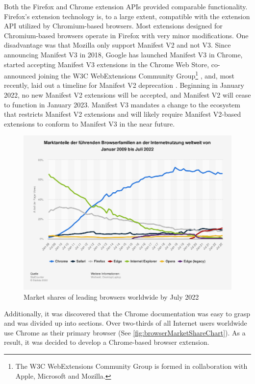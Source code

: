 Both the Firefox and Chrome extension APIs provided comparable functionality. Firefox's extension technology is, to a large extent, compatible with the extension API utilized by Chromium-based browsers. Most extensions designed for Chromium-based browsers operate in Firefox with very minor modifications. One disadvantage was that Mozilla only support Manifest V2 and not V3. Since announcing Manifest V3 in 2018, Google has launched Manifest V3 in Chrome, started accepting Manifest V3 extensions in the Chrome Web Store, co-announced joining the W3C WebExtensions Community Group\footnote{The W3C WebExtensions Community Group is formed in collaboration with Apple, Microsoft and Mozilla.} , and, most recently, laid out a timeline for Manifest V2 deprecation \autocite{alexei2021manifest}. Beginning in January 2022, no new Manifest V2 extensions will be accepted, and Manifest V2 will cease to function in January 2023. Manifest V3 mandates a change to the ecosystem that restricts Manifest V2 extensions and will likely require Manifest V2-based extensions to conform to Manifest V3 in the near future.

\begin{figure}[H]
  \includegraphics[width=\textwidth]{assets/statistic_id157944_marktanteile-fuehrender-browser-weltweit-bis-juli-2022.png}
  \caption{Market shares of leading browsers worldwide by July 2022}
  \label{fig:browserMarketShareChart}
\end{figure}

Additionally, it was discovered that the Chrome documentation was easy to grasp and was divided up into sections. Over two-thirds of all Internet users worldwide use Chrome as their primary browser (See \autoref{fig:browserMarketShareChart}). As a result, it was decided to develop a Chrome-based browser extension.

